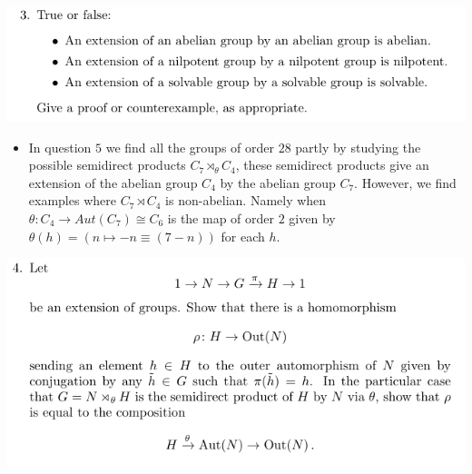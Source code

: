 \documentclass[12pt,letterpaper,boxed]{hmcpset}
\begin{document}
\begin{problem}
	\includegraphics[scale=0.8]{3.png}
	\hfill
\end{problem}
\begin{solution}
\begin{itemize}
\item In question $5$ we find all the groups of order $28$ partly by
studying the possible semidirect products $C_7 \rtimes_\theta C_4$, these semidirect
products give an extension of the abelian group $C_4$ by the abelian
group $C_7$. However, we find examples where $C_7 \rtimes C_4$ is
non-abelian. Namely when $\theta: C_4 \to Aut(C_7) \cong C_6$ is the
map of order $2$ given by $\theta(h) = (n \mapsto -n \equiv (7 -n))$
for each $h$.
\end{itemize}
\end{solution}

\newpage


\begin{problem}
	\includegraphics[scale=0.8]{4.png}
	\hfill
\end{problem}
\end{document}

